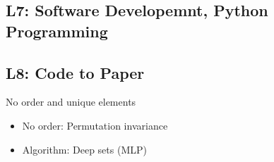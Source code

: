 \documentclass{article}
\begin{document}

\begin{center}
    \section*{L7: Software Developemnt, Python Programming}
\end{center}

\newpage

\begin{center}
    \section*{L8: Code to Paper}
\end{center}

\newpage

No order and unique elements
\begin{itemize}
    \item No order: Permutation invariance 
    \item Algorithm: Deep sets (MLP)
\end{itemize}
\end{document}
